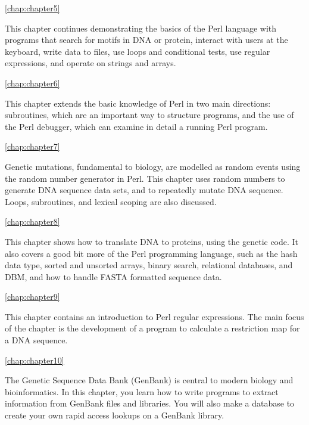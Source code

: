 \autoref{chap:chapter5}
\begin{adjustwidth}{1cm}{0cm}
This chapter continues demonstrating the basics of the Perl language with programs that search for motifs in DNA or protein, interact with users at the keyboard, write data to files, use loops and conditional tests, use regular expressions, and operate on strings and arrays.
\end{adjustwidth}

\autoref{chap:chapter6}
\begin{adjustwidth}{1cm}{0cm}
This chapter extends the basic knowledge of Perl in two main directions: subroutines, which are an important way to structure programs, and the use of the Perl debugger, which can examine in detail a running Perl program.
\end{adjustwidth}

\autoref{chap:chapter7}
\begin{adjustwidth}{1cm}{0cm}
Genetic mutations, fundamental to biology, are modelled as random events using the random number generator in Perl. This chapter uses random numbers to generate DNA sequence data sets, and to repeatedly mutate DNA sequence. Loops, subroutines, and lexical scoping are also discussed.
\end{adjustwidth}

\autoref{chap:chapter8}
\begin{adjustwidth}{1cm}{0cm}
This chapter shows how to translate DNA to proteins, using the genetic code. It also covers a good bit more of the Perl programming language, such as the hash data type, sorted and unsorted arrays, binary search, relational databases, and DBM, and how to handle FASTA formatted sequence data.
\end{adjustwidth}

\autoref{chap:chapter9}
\begin{adjustwidth}{1cm}{0cm}
This chapter contains an introduction to Perl regular expressions. The main focus of the chapter is the development of a program to calculate a restriction map for a DNA sequence.
\end{adjustwidth}

\autoref{chap:chapter10}
\begin{adjustwidth}{1cm}{0cm}
The Genetic Sequence Data Bank (GenBank) is central to modern biology and bioinformatics. In this chapter, you learn how to write programs to extract information from GenBank files and libraries. You will also make a database to create your own rapid access lookups on a GenBank library.
\end{adjustwidth}

